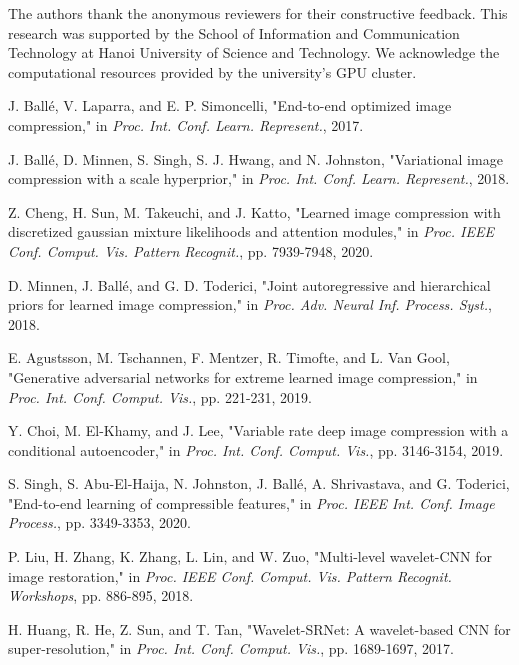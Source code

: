 \documentclass[conference]{IEEEtran}
\begin{document}
The authors thank the anonymous reviewers for their constructive feedback. This research was supported by the School of Information and Communication Technology at Hanoi University of Science and Technology. We acknowledge the computational resources provided by the university's GPU cluster.

\begin{thebibliography}{00}

J. Ballé, V. Laparra, and E. P. Simoncelli, "End-to-end optimized image compression," in \textit{Proc. Int. Conf. Learn. Represent.}, 2017.

J. Ballé, D. Minnen, S. Singh, S. J. Hwang, and N. Johnston, "Variational image compression with a scale hyperprior," in \textit{Proc. Int. Conf. Learn. Represent.}, 2018.

Z. Cheng, H. Sun, M. Takeuchi, and J. Katto, "Learned image compression with discretized gaussian mixture likelihoods and attention modules," in \textit{Proc. IEEE Conf. Comput. Vis. Pattern Recognit.}, pp. 7939-7948, 2020.

D. Minnen, J. Ballé, and G. D. Toderici, "Joint autoregressive and hierarchical priors for learned image compression," in \textit{Proc. Adv. Neural Inf. Process. Syst.}, 2018.

E. Agustsson, M. Tschannen, F. Mentzer, R. Timofte, and L. Van Gool, "Generative adversarial networks for extreme learned image compression," in \textit{Proc. Int. Conf. Comput. Vis.}, pp. 221-231, 2019.

Y. Choi, M. El-Khamy, and J. Lee, "Variable rate deep image compression with a conditional autoencoder," in \textit{Proc. Int. Conf. Comput. Vis.}, pp. 3146-3154, 2019.

S. Singh, S. Abu-El-Haija, N. Johnston, J. Ballé, A. Shrivastava, and G. Toderici, "End-to-end learning of compressible features," in \textit{Proc. IEEE Int. Conf. Image Process.}, pp. 3349-3353, 2020.

P. Liu, H. Zhang, K. Zhang, L. Lin, and W. Zuo, "Multi-level wavelet-CNN for image restoration," in \textit{Proc. IEEE Conf. Comput. Vis. Pattern Recognit. Workshops}, pp. 886-895, 2018.

H. Huang, R. He, Z. Sun, and T. Tan, "Wavelet-SRNet: A wavelet-based CNN for super-resolution," in \textit{Proc. Int. Conf. Comput. Vis.}, pp. 1689-1697, 2017.


\end{thebibliography}
\end{document}
